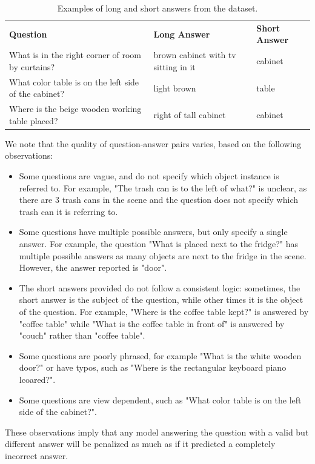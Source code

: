 \begin{table}[h!]
    \centering
    \caption{Examples of long and short answers from the dataset. \bigskip}
    \begin{tabular}{lll}
    \textbf{Question}                                    & \textbf{Long Answer}                & \textbf{Short Answer} \\
    What is in the right corner of room by curtains?     & brown cabinet with tv sitting in it & cabinet               \\
    What color table is on the left side of the cabinet? & light brown                         & table                 \\
    Where is the beige wooden working table placed?      & right of tall cabinet               & cabinet              
    \end{tabular}
\end{table}

\noindent
We note that the quality of question-answer pairs varies, based on the following observations:
\begin{itemize}
    \item Some questions are vague, and do not specify which object instance is referred to. For example, "The trash can is to the left of what?" is unclear, as there are 3 trash cans in the scene and the question does not specify which trash can it is referring to.
    
    \item Some questions have multiple possible answers, but only specify a single answer. For example, the question "What is placed next to the fridge?" has multiple possible answers as many objects are next to the fridge in the scene. However, the answer reported is "door".
    
    \item The short answers provided do not follow a consistent logic: sometimes, the short answer is the subject of the question, while other times it is the object of the question. For example, "Where is the coffee table kept?" is answered by "coffee table" while "What is the coffee table in front of" is answered by "couch" rather than "coffee table".
    
    \item Some questions are poorly phrased, for example "What is the white wooden door?" or have typos, such as "Where is the rectangular keyboard piano lcoared?".
    
    \item Some questions are view dependent, such as "What color table is on the left side of the cabinet?".
\end{itemize}
These observations imply that any model answering the question with a valid but different answer will be penalized as much as if it predicted a completely incorrect answer.

